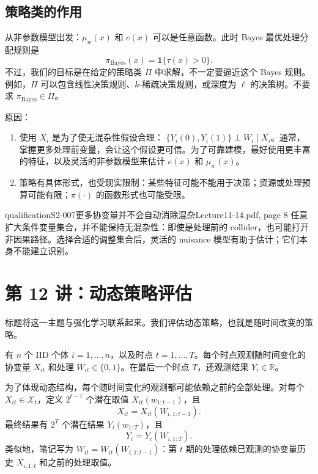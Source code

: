 \subsection{策略类的作用}
从非参数模型出发：$\mu_w(x)$ 和 $e(x)$ 可以是任意函数。此时 Bayes 最优处理分配规则是
\[
 \pi_{\mathrm{Bayes}}(x)=\mathbf1\{\tau(x)>0\}.
\]
不过，我们的目标是在给定的策略类 $\Pi$ 中求解，不一定要逼近这个 Bayes 规则。例如，$\Pi$ 可以包含线性决策规则、$k$-稀疏决策规则，或深度为 $\ell$ 的决策树。不要求 $\pi_{\mathrm{Bayes}}\in\Pi$。

原因：
\begin{enumerate}
 \item 使用 $X_i$ 是为了使无混杂性假设合理：
 $\{Y_i(0),Y_i(1)\}\perp W_i\mid X_i$。通常，掌握更多处理前变量，会让这个假设更可信。为了可靠建模，最好使用更丰富的特征，以及灵活的非参数模型来估计 $e(x)$ 和 $\mu_w(x)$。
 \item 策略有具体形式，也受现实限制：某些特征可能不能用于决策；资源或处理预算可能有限；$\pi(\cdot)$ 的函数形式也可能受限。
\end{enumerate}

\begin{reviewnote}{qualification}{S2-007}{更多协变量并不会自动消除混杂}{Lecture11-14.pdf, page 8}
任意扩大条件变量集合，并不能保持无混杂性：即使是处理前的 collider，也可能打开非因果路径。选择合适的调整集合后，灵活的 nuisance 模型有助于估计；它们本身不能建立识别。
\end{reviewnote}


\section{第 12 讲：动态策略评估}
标题将这一主题与强化学习联系起来。我们评估动态策略，也就是随时间改变的策略。

有 $n$ 个 IID 个体 $i=1,\ldots,n$，以及时点 $t=1,\ldots,T$。每个时点观测随时间变化的协变量 $X_{it}$ 和处理 $W_{it}\in\{0,1\}$。在最后一个时点 $T$，还观测结果 $Y_i\in\mathbb R$。

为了体现动态结构，每个随时间变化的观测都可能依赖之前的全部处理。对每个 $X_{it}\in\mathcal X_t$，定义 $2^{t-1}$ 个潜在取值 $X_{it}(w_{1:t-1})$，且
\[
 X_{it}=X_{it}(W_{i,1:t-1}).
\]
最终结果有 $2^T$ 个潜在结果 $Y_i(w_{1:T})$，且
\[
 Y_i=Y_i(W_{i,1:T}).
\]
类似地，笔记写为 $W_{it}=W_{it}(W_{i,1:t-1})$：第 $t$ 期的处理依赖已观测的协变量历史 $X_{i,1:t}$ 和之前的处理取值。

